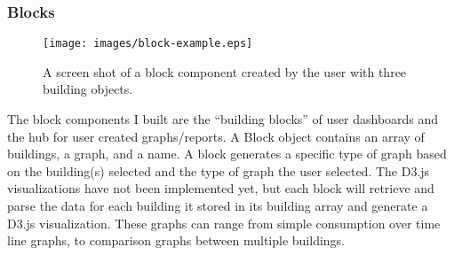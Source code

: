 \documentclass[letterpaper,10pt,serif,draftclsnofoot,onecolumn,compsoc,titlepage]{IEEEtran}
\begin{document}
\subsubsection{Blocks}
\begin{figure}[H]
  \centering
  \texttt{[image: images/block-example.eps]}
  \caption{A screen shot of a block component created by the user with three building objects.}
\end{figure}
The block components I built are the ``building blocks'' of user dashboards and the hub for user created graphs/reports. A Block object contains an array of buildings, a graph, and a name. A block generates a specific type of graph based on the building(s) selected and the type of graph the user selected. The D3.js visualizations have not been implemented yet, but each block will retrieve and parse the data for each building it stored in its building array and generate a D3.js visualization. These graphs can range from simple consumption over time line graphs, to comparison graphs between multiple buildings.\\
\end{document}
